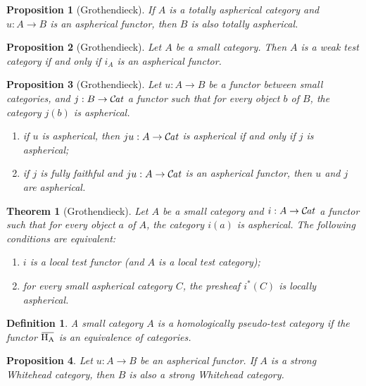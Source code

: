 \documentclass[10pt,a4paper]{amsart}
\newtheorem{prop}{Proposition}
\newtheorem{theorem}{Theorem}
\newtheorem{defin}{Definition}
\newcommand{\Cat}{{\mathcal{C}\mspace{-2.mu}\it{at}}}
\newcommand{\Hf}[1]{\operatorname{H_{#1}}}
\newcommand{\overbar}[1]{\mkern 1.5mu\overline{\mkern-1.5mu#1\mkern-1.5mu}\mkern 1.5mu}
\begin{document}
\begin{prop}[Grothendieck]\label{totAspheriqueMorphismeAspherique}
If $A$ is a totally aspherical category and $u: A \to B$ is an aspherical
functor, then $B$ is also totally aspherical.
\end{prop}

\begin{prop}[Grothendieck]
\label{prop:testFaiblei_AAspherique}
Let $A$ be a small category. Then $A$ is a weak test category if and only if
$i_A$ is an aspherical functor.
\end{prop}

\begin{prop}[Grothendieck]\label{lemmeFoncteursAspheriquesTriCommutatif}
Let $u: A \to B$ be a functor between small categories, and $j: B \to \Cat$ a
functor such that for every object $b$ of $B$, the category $j(b)$ is
aspherical.
\begin{enumerate}
\item if $u$ is aspherical, then $ju: A \to \Cat$ is aspherical if
and only if $j$ is aspherical;
\item if $j$ is fully faithful and $ju: A \to \Cat$ is an aspherical functor, then
$u$ and $j$ are aspherical.
\end{enumerate}
\end{prop}

\begin{theorem}[Grothendieck]
\label{thm:EquivalencesFoncteursTestLocal}
Let $A$ be a small category and $i:A \to \Cat$ a functor such that for
every object $a$ of $A$, the category $i(a)$ is aspherical. The
following conditions are equivalent:
\begin{enumerate}
\item $i$ is a local test functor (and $A$ is a local test category);
\item  for every small aspherical category $C$, the presheaf $i^*(C)$
is locally aspherical.
\end{enumerate}
\end{theorem}

\begin{defin}\label{def:homPseudoTest}
A small category $A$ is a \emph{homologically pseudo-test category} if
the functor $\overbar{\Hf{A}}$ is an equivalence of categories.
\end{defin}

\begin{prop}\label{prop:aspheriqueSourceWhitehead}
Let $u: A \to B$ be an aspherical functor. If $A$ is a strong Whitehead
category, then $B$ is also a strong Whitehead category.
\end{prop}
\end{document}
